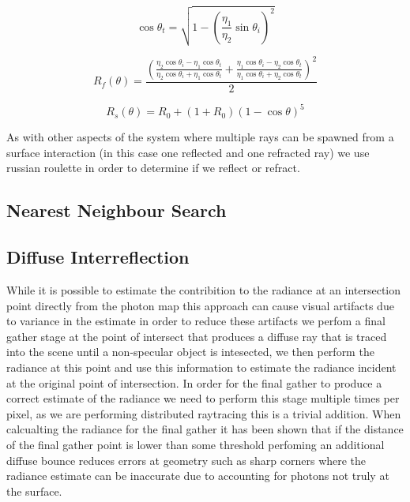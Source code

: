 
\begin{equation}
\cos{\theta_t} = \sqrt{1 - \left(\frac{\eta_1}{\eta_2}\sin{\theta_i}\right)^2}
\end{equation}

\begin{equation}
R_f(\theta)
=
\frac{
	\left(
	\frac
	{
	\eta_2 \cos{\theta_i} - \eta_1 \cos{\theta_t}
	}
	{
	\eta_2 \cos{\theta_i} + \eta_1 \cos{\theta_t}
	}
	+
	\frac
	{
	\eta_1 \cos{\theta_i} - \eta_2 \cos{\theta_t}
	}
	{
	\eta_1 \cos{\theta_i} + \eta_2 \cos{\theta_t}
	}
\right)^2
}{2}
\label{eq:fresnel}
\end{equation}

\begin{equation}
R_s(\theta)=R_0 + \left(1 + R_0\right)\left(1 - \cos\theta\right)^5
\label{eq:schlick}
\end{equation}

As with other aspects of the system where multiple rays can be spawned from a surface interaction (in this case one reflected and one refracted ray)
we use russian roulette in order to determine if we reflect or refract.

\subsection{Nearest Neighbour Search}

\subsection{Diffuse Interreflection}
While it is possible to estimate the contribition to the radiance at an intersection point directly from the photon map this
approach can cause visual artifacts due to variance in the estimate in order to reduce these artifacts we perfom a final gather
stage at the point of intersect that produces a diffuse ray that is traced into the scene until a non-specular object is intesected,
we then perform the radiance at this point and use this information to estimate the radiance incident at the original point of intersection.
In order for the final gather to produce a correct estimate of the radiance we need to perform this stage multiple times per pixel, as we
are performing distributed raytracing this is a trivial addition. When calcualting the radiance for the final gather it has been shown 
that if the distance of the final gather point is lower than some threshold perfoming an additional diffuse bounce reduces errors at geometry
such as sharp corners where the radiance estimate can be inaccurate due to accounting for photons not truly at the surface.

